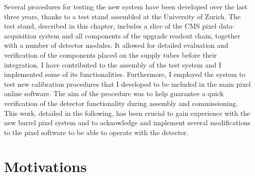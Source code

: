 Several procedures for testing the new system have been developed over the last three years, thanks to a test stand assembled at the University of Zurich. The test stand, described in this chapter, includes a slice of the CMS pixel data-acquisition system and all components of the upgrade readout chain, together with a number of detector modules. It allowed for detailed evaluation and verification of the components placed on the supply tubes before their integration.
I have contributed to the assembly of the test system and I implemented some of its functionalities. Furthermore, I employed the system to test new calibration procedures that I developed to be included in the main pixel online software. The aim of the procedure was to help guarantee a quick verification of the detector functionality during assembly and commissioning. This work, detailed in the following, has been crucial to gain experience with the new barrel pixel system and to acknowledge and implement several modifications to the pixel software to be able to operate with the detector.

\section{Motivations}

